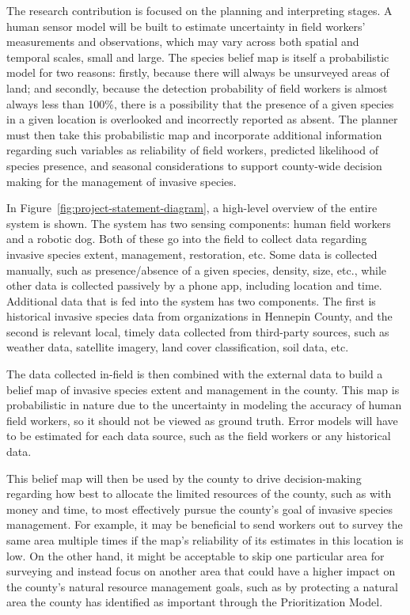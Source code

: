\documentclass{article}
\begin{document}
The research contribution is focused on the planning and interpreting stages. A human sensor model will be built to estimate uncertainty in field workers’ measurements and observations, which may vary across both spatial and temporal scales, small and large. The species belief map is itself a probabilistic model for two reasons: firstly, because there will always be unsurveyed areas of land; and secondly, because the detection probability of field workers is almost always less than 100\%, there is a possibility that the presence of a given species in a given location is overlooked and incorrectly reported as absent. The planner must then take this probabilistic map and incorporate additional information regarding such variables as reliability of field workers, predicted likelihood of species presence, and seasonal considerations to support county-wide decision making for the management of invasive species.

In Figure~\ref{fig:project-statement-diagram}, a high-level overview of the entire system is shown. The system has two sensing components: human field workers and a robotic dog. Both of these go into the field to collect data regarding invasive species extent, management, restoration, etc. Some data is collected manually, such as presence/absence of a given species, density, size, etc., while other data is collected passively by a phone app, including location and time.
Additional data that is fed into the system has two components. The first is historical invasive species data from organizations in Hennepin County, and the second is relevant local, timely data collected from third-party sources, such as weather data, satellite imagery, land cover classification, soil data, etc.

The data collected in-field is then combined with the external data to build a belief map of invasive species extent and management in the county. This map is probabilistic in nature due to the uncertainty in modeling the accuracy of human field workers, so it should not be viewed as ground truth. Error models will have to be estimated for each data source, such as the field workers or any historical data.

This belief map will then be used by the county to drive decision-making regarding how best to allocate the limited resources of the county, such as with money and time, to most effectively pursue the county’s goal of invasive species management. For example, it may be beneficial to send workers out to survey the same area multiple times if the map’s reliability of its estimates in this location is low. On the other hand, it might be acceptable to skip one particular area for surveying and instead focus on another area that could have a higher impact on the county’s natural resource management goals, such as by protecting a natural area the county has identified as important through the Prioritization Model.
\end{document}
